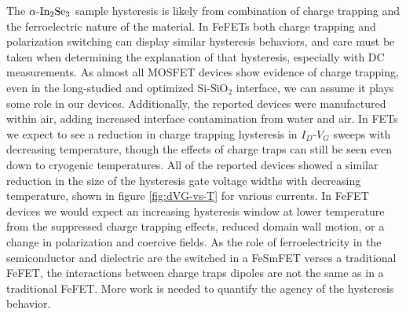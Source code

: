 The $\textrm{\ensuremath{\alpha}-In}_{2}\textrm{Se}_{3}$ sample hysteresis
is likely from combination of charge trapping and the ferroelectric
nature of the material. In FeFETs both charge trapping and polarization
switching can display similar hysteresis behaviors, and care must
be taken when determining the explanation of that hysteresis\citep{kokil2012techniques,yurchuk2016chargetrapping,osullivan2020defect,jung2020impact},
especially with DC measurements. As almost all MOSFET devices show
evidence of charge trapping, even in the long-studied and optimized
Si-$\mathrm{SiO_{2}}$ interface, we can assume it plays some role
in our devices. Additionally, the reported devices were manufactured
within air, adding increased interface contamination from water and
air\citep{datye2018reduction,bartolomeo2017hysteresis,kim2018analysis}.
In FETs we expect to see a reduction in charge trapping hysteresis
in $I_{D}$-$V_{G}$ sweeps with decreasing temperature\citep{datye2018reduction,kim2018analysis,park2021interface,bartolomeo2017hysteresis,guo2015charge},
though the effects of charge traps can still be seen even down to
cryogenic temperatures\citep{liu2021cryogenic,beckers2020physical,park2021interface,beckers2018cryogenic,powell1983charge}.
All of the reported devices showed a similar reduction in the size
of the hysteresis gate voltage widths with decreasing temperature,
shown in figure \ref{fig:dVG-vs-T} for various currents. In FeFET
devices we would expect an increasing hysteresis window at lower temperature
from the suppressed charge trapping effects\citep{wang2020cryogenic,ni2018critical,ali2020study},
reduced domain wall motion\citep{tan2020hot}, or a change in polarization
and coercive fields\citep{ali2020study}. As the role of ferroelectricity
in the semiconductor and dielectric are the switched in a FeSmFET
verses a traditional FeFET, the interactions between charge traps
dipoles are not the same as in a traditional FeFET. More work is needed
to quantify the agency of the hysteresis behavior.

